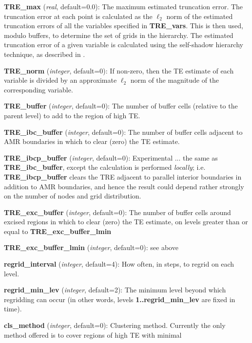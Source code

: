 \documentclass[aps,amssymb,unsortedaddress,nofootinbib]{revtex4}
\def\lsep{\itemsep 0.05in}
\begin{document}
\begin{list}{}{\lsep}
\item {\bf TRE\_max} ({\em real}, default=0.0): The maximum estimated truncation
      error. The truncation error at each point is calculated as the $\ell_2$ norm 
      of the estimated truncation errors of all the variables specified in {\bf TRE\_vars}.
      This is then used, modulo buffers, to determine the set of grids in the
      hierarchy.
      The estimated truncation error of a given variable is calculated
      using the self-shadow hierarchy technique, as described in \cite{fpthesis}.
\item {\bf TRE\_norm} ({\em integer}, default=0): If non-zero, then the 
      TE estimate of each variable is divided by an approximate $\ell_2$ norm
      of the magnitude of the corresponding variable.
\item {\bf TRE\_buffer} ({\em integer}, default=0): The number of buffer cells
      (relative to the parent level) to add to the region of high TE.
\item {\bf TRE\_ibc\_buffer} ({\em integer}, default=0):
      The number of buffer cells adjacent to AMR boundaries in which to
      clear (zero) the TE estimate.
\item {\bf TRE\_ibcp\_buffer} ({\em integer}, default=0):
      Experimental ... the same as {\bf TRE\_ibc\_buffer}, except the calculation is
      performed {\em locally}; i.e. {\bf TRE\_ibcp\_buffer} clears the
      TRE adjacent to parallel interior boundaries in addition to AMR boundaries,
      and hence the result could depend rather strongly on the number of nodes
      and grid distribution.
\item {\bf TRE\_exc\_buffer} ({\em integer}, default=0):
      The number of buffer cells around excised regions in which to
      clear (zero) the TE estimate, on levels greater than or equal to
      {\bf TRE\_exc\_buffer\_lmin}
\item {\bf TRE\_exc\_buffer\_lmin} ({\em integer}, default=0): see above
\item {\bf regrid\_interval} ({\em integer}, default=4): How often, in steps,
      to regrid on each level.
\item {\bf regrid\_min\_lev} ({\em integer}, default=2): The minimum level beyond which
      regridding can occur (in other words, levels {\bf 1..regrid\_min\_lev} are
      fixed in time).
\item {\bf cls\_method} ({\em integer}, default=0): Clustering method. Currently
      the only method offered is to cover regions of high TE with minimal

\end{list}
\end{document}
